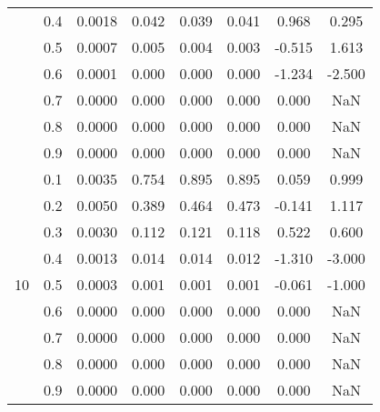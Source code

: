 \documentclass[11pt,a4paper]{report}
\begin{document}
\begin{longtable}{ | c | c || c | c | c | c | c | c | }
 & 0.4 & 0.0018 & 0.042 & 0.039 & 0.041 & 0.968 & 0.295 \\
 & 0.5 & 0.0007 & 0.005 & 0.004 & 0.003 & -0.515 & 1.613 \\
 & 0.6 & 0.0001 & 0.000 & 0.000 & 0.000 & -1.234 & -2.500 \\
 & 0.7 & 0.0000 & 0.000 & 0.000 & 0.000 & 0.000 & NaN \\
 & 0.8 & 0.0000 & 0.000 & 0.000 & 0.000 & 0.000 & NaN \\
 & 0.9 & 0.0000 & 0.000 & 0.000 & 0.000 & 0.000 & NaN \\
 \hline
\multirow{9}{*}{10} & 0.1 & 0.0035 & 0.754 & 0.895 & 0.895 & 0.059 & 0.999 \\
 & 0.2 & 0.0050 & 0.389 & 0.464 & 0.473 & -0.141 & 1.117 \\
 & 0.3 & 0.0030 & 0.112 & 0.121 & 0.118 & 0.522 & 0.600 \\
 & 0.4 & 0.0013 & 0.014 & 0.014 & 0.012 & -1.310 & -3.000 \\
 & 0.5 & 0.0003 & 0.001 & 0.001 & 0.001 & -0.061 & -1.000 \\
 & 0.6 & 0.0000 & 0.000 & 0.000 & 0.000 & 0.000 & NaN \\
 & 0.7 & 0.0000 & 0.000 & 0.000 & 0.000 & 0.000 & NaN \\
 & 0.8 & 0.0000 & 0.000 & 0.000 & 0.000 & 0.000 & NaN \\
 & 0.9 & 0.0000 & 0.000 & 0.000 & 0.000 & 0.000 & NaN \\
 \hline
\hline
\end{longtable}
\end{document}
